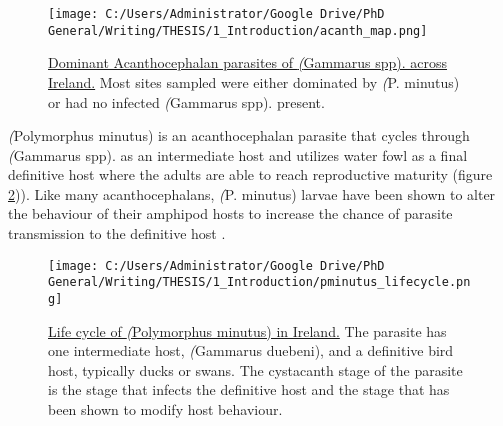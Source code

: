 
\begin{figure}[H] %
	  \centering
	  \texttt{[image: C:/Users/Administrator/Google Drive/PhD General/Writing/THESIS/1\_Introduction/acanth\_map.png]}
	    \caption[Dominant Acanthocephalan parasites of \emph(Gammarus spp). across Ireland] %
	    {\underline{Dominant Acanthocephalan parasites of \emph(Gammarus spp). across Ireland.} Most sites sampled were either dominated by \emph(P. minutus) or had no infected \emph(Gammarus spp). present.}%
	  \label{fig:acanth_map}
	\end{figure}
	

\emph(Polymorphus minutus) is an acanthocephalan parasite that cycles through \emph(Gammarus spp). as an intermediate host and utilizes water fowl as a final definitive host where the adults are able to reach reproductive maturity (figure \ref{fig:lifecycle})). Like many acanthocephalans, \emph(P. minutus) larvae have been shown to alter the behaviour of their amphipod hosts to increase the chance of parasite transmission to the definitive host \citep{jacquin2014, labaude2017}. 


\begin{figure}[H] %
	  \centering
	  \texttt{[image: C:/Users/Administrator/Google Drive/PhD General/Writing/THESIS/1\_Introduction/pminutus\_lifecycle.png]}
	    \caption[Life cycle of \emph(Polymorphus minutus in Ireland)] %
	    {\underline{Life cycle of \emph(Polymorphus minutus) in Ireland.} The parasite has one intermediate host, \emph(Gammarus duebeni), and a definitive bird host, typically ducks or swans. The cystacanth stage of the parasite is the stage that infects the definitive host and the stage that has been shown to modify host behaviour.}%
	  \label{fig:lifecycle}
	\end{figure}
	


